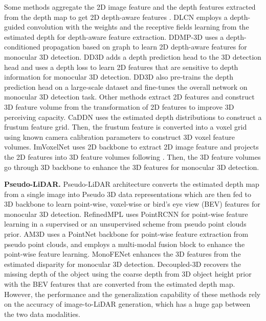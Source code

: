 \documentclass[10pt,twocolumn,letterpaper]{article}
\begin{document}
Some methods aggregate the 2D image feature and the depth features extracted from the depth map to get 2D depth-aware features \cite{ding2019learning,park2021pseudo}. DLCN \cite{ding2019learning} employs a depth-guided convolution with the weights and the receptive fields learning from the estimated depth for depth-aware feature extraction. DDMP-3D \cite{wang2021depth} uses a depth-conditioned propagation based on graph to learn 2D depth-aware features for monocular 3D detection. DD3D \cite{park2021pseudo} adds a depth prediction head to the 3D detection head and uses a depth loss to learn 2D features that are sensitive to depth information for monocular 3D detection. DD3D\cite{park2021pseudo} also pre-trains the depth prediction head on a large-scale dataset and fine-tunes the overall network on monocular 3D detection task.
Other methods extract 2D features and construct 3D feature volume from the transformation of 2D features to improve 3D perceiving capacity. CaDDN \cite{reading2021categorical} uses the estimated depth distributions to construct a frustum feature grid. Then, the frustum feature is converted into a voxel grid using known camera calibration parameters to construct 3D voxel feature volumes. ImVoxelNet \cite{rukhovich2021imvoxelnet} uses 2D backbone to extract 2D image feature and projects the 2D features into 3D feature volumes following \cite{murez2020atlas}. Then, the 3D feature volumes go through 3D backbone to enhance the 3D features for monocular 3D detection.

\textbf{Pseudo-LiDAR.} Pseudo-LiDAR architecture converts the estimated depth map from a single image into Pseudo 3D data representations \cite{vianney2019refinedmpl,cai2020monocular} which are then fed to 3D backbone to learn point-wise, voxel-wise or bird's eye view (BEV) features for monocular 3D detection. RefinedMPL \cite{vianney2019refinedmpl} uses PointRCNN \cite{shi2019pointrcnn} for point-wise feature learning in a supervised or an unsupervised scheme from pseudo point clouds prior. AM3D \cite{ma2019accurate} uses a PointNet \cite{qi2017pointnet} backbone for point-wise feature extraction from pseudo point clouds, and employs a multi-modal fusion block to enhance the point-wise feature learning. MonoFENet\cite{bao2019monofenet} enhances the 3D features from the estimated disparity for monocular 3D detection. Decoupled-3D \cite{cai2020monocular} recovers the missing depth of the object using the coarse depth from 3D object height prior with the BEV features that are converted from the estimated depth map. However, the performance and the generalization capability of these methods rely on the accuracy of image-to-LiDAR generation, which has a huge gap between the two data modalities. 
\end{document}
